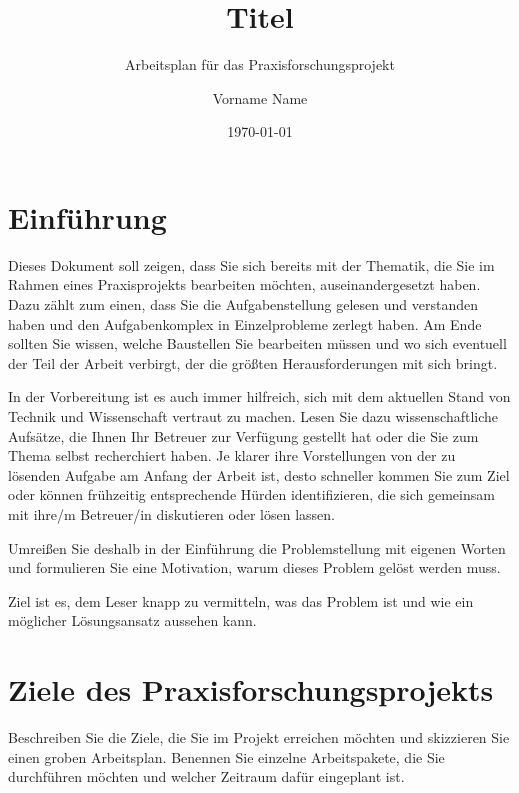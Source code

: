 \documentclass[
  a4paper,	      %
	11pt,           %
  parskip=half*,  %
]{scrartcl}
\begin{document}
\title{Titel}  %
\subtitle{Arbeitsplan für das Praxisforschungsprojekt} %
\author{Vorname Name} %
\date{\today} %
\maketitle %

\section{Einführung}
Dieses Dokument soll zeigen, dass Sie sich bereits mit der Thematik, die Sie im Rahmen eines Praxisprojekts bearbeiten möchten, auseinandergesetzt haben. Dazu zählt zum einen, dass Sie die Aufgabenstellung gelesen und verstanden haben und den Aufgabenkomplex in Einzelprobleme zerlegt haben. Am Ende sollten Sie wissen, welche \glqq Baustellen\grqq{} Sie bearbeiten müssen und wo sich eventuell der Teil der Arbeit verbirgt, der die größten Herausforderungen mit sich bringt.

In der Vorbereitung ist es auch immer hilfreich, sich mit dem aktuellen Stand von Technik und Wissenschaft vertraut zu machen. Lesen Sie dazu wissenschaftliche Aufsätze, die Ihnen Ihr Betreuer zur Verfügung gestellt hat oder die Sie zum Thema selbst recherchiert haben. Je klarer ihre Vorstellungen von der zu lösenden Aufgabe am Anfang der Arbeit ist, desto schneller kommen Sie zum Ziel oder können frühzeitig entsprechende Hürden identifizieren, die sich gemeinsam mit ihre/m Betreuer/in diskutieren oder lösen lassen.

Umreißen Sie deshalb in der Einführung die Problemstellung mit eigenen Worten und formulieren Sie eine Motivation, warum dieses Problem gelöst werden muss.

Ziel ist es, dem Leser knapp zu vermitteln, was das Problem ist und wie ein möglicher Lösungsansatz aussehen kann.

\section{Ziele des Praxisforschungsprojekts}

Beschreiben Sie die Ziele, die Sie im Projekt erreichen möchten und skizzieren Sie einen groben Arbeitsplan. Benennen Sie einzelne Arbeitspakete, die Sie durchführen möchten und welcher Zeitraum dafür eingeplant ist.
\end{document}
